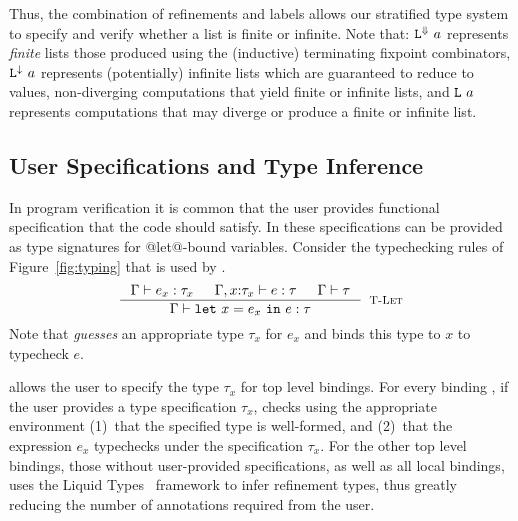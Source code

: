 %
Thus, the combination of refinements 
and labels allows our stratified type 
system to specify and verify whether 
a list is finite or infinite.
%
Note that:
%
${\mathtt{L}}^{\Downarrow}\ a$ represents
\emph{finite} lists \ie those 
produced using the (inductive) 
terminating fixpoint combinators,
%
${\mathtt{L}}^{\downarrow}\ a$ represents 
(potentially) infinite lists which 
are guaranteed to reduce to values, 
\ie non-diverging computations that
yield finite or infinite lists,
and
${\mathtt{L}}\ a$ represents 
computations that may diverge or 
produce a finite or infinite list.

\subsection{User Specifications and Type Inference}

In program verification it is common that the user provides functional
specification that the code should satisfy.
In \toolname these specifications can be provided as type signatures 
for @let@-bound variables.
%
Consider the typechecking rules of Figure~\ref{fig:typing}
that is used by \declang.
%
$$
\inference{
	\hastype{\Gamma}{e_x}{\tau_{x}} &&
	\hastype{\Gamma,x\colon\tau_x}{e}{\tau} &&
	\iswellformed{\Gamma}{\tau}
}{
	\hastype{\Gamma}{\elet{x}{e_x}{e}}{\tau}
}[\rtlet]
$$
%
Note that \rtlet \emph{guesses} an appropriate type $\tau_x$
for $e_x$ and binds this type to $x$ to typecheck $e$.

\toolname allows the user to specify the type $\tau_x$ for top level bindings.
%
For every binding , if the user provides a type specification $\tau_x$,
\toolname checks using the appropriate environment 
(1)~that the specified type is well-formed, and 
(2)~that the expression $e_x$ typechecks under the specification $\tau_x$.
%
For the other top level bindings, \ie those without user-provided specifications, 
as well as all local bindings, \toolname uses the Liquid Types~\citep{LiquidPLDI08} 
framework to infer refinement types, thus greatly reducing the number of annotations 
required from the user.

